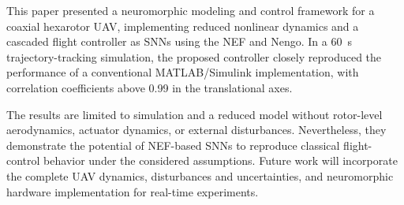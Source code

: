 \documentclass[conference]{IEEEtran}
\begin{document}
This paper presented a neuromorphic modeling and control framework for a coaxial hexarotor UAV, implementing reduced nonlinear dynamics and a cascaded flight controller as SNNs using the NEF and Nengo. In a 60~s trajectory-tracking simulation, the proposed controller closely reproduced the performance of a conventional MATLAB/Simulink implementation, with correlation coefficients above 0.99 in the translational axes.

The results are limited to simulation and a reduced model without rotor-level aerodynamics, actuator dynamics, or external disturbances. Nevertheless, they demonstrate the potential of NEF-based SNNs to reproduce classical flight-control behavior under the considered assumptions. Future work will incorporate the complete UAV dynamics, disturbances and uncertainties, and neuromorphic hardware implementation for real-time experiments.



\end{document}
